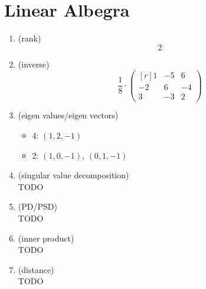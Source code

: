 \section{Linear Albegra}
\begin{enumerate}[(1)]
	\item (rank) \\
		\[ 2 \]
	\item (inverse) \\
		\[
			\frac{1}{8} \cdot
			\begin{pmatrix*}[r]
				1 & -5 & 6 \\
				-2 & 6 & -4 \\
				3 & -3 & 2
			\end{pmatrix*}
		\]
	\item (eigen values/eigen vectors) \\
		\begin{itemize}
			\item 4: $(1, 2, -1)$
			\item 2: $(1, 0, -1)$, $(0, 1, -1)$
		\end{itemize}
	\item (singular value decomposition) \\
		TODO
	\item (PD/PSD) \\
		TODO
	\item (inner product) \\
		TODO
	\item (distance) \\
		TODO
\end{enumerate}
